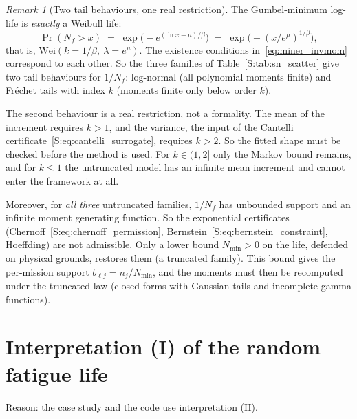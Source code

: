 \documentclass[11pt,a4paper]{article}
\theoremstyle{plain}
\theoremstyle{definition}
\theoremstyle{remark}
\newtheorem{remark}[theorem]{Remark}
\begin{document}
\begin{remark}[Two tail behaviours, one real restriction]\label{rem:miner_tails}
The Gumbel-minimum log-life is \emph{exactly} a Weibull life:
\begin{equation}
  \Pr(N_f > x) \;=\; \exp\big(-e^{(\ln x - \mu)/\beta}\big) \;=\; \exp\big(-(x/e^{\mu})^{1/\beta}\big),
\end{equation}
that is, $\mathrm{Wei}(k = 1/\beta,\ \lambda = e^{\mu})$.
The existence conditions in~\eqref{eq:miner_invmom} correspond to each other.
So the three families of Table~\ref{S:tab:sn_scatter} give two tail behaviours for $1/N_f$: log-normal (all polynomial moments finite) and Fr\'echet tails with index $k$ (moments finite only below order $k$).

The second behaviour is a real restriction, not a formality.
The mean of the increment requires $k > 1$, and the variance, the input of the Cantelli certificate~\eqref{S:eq:cantelli_surrogate}, requires $k > 2$.
So the fitted shape must be checked before the method is used.
For $k \in (1,2]$ only the Markov bound remains, and for $k \le 1$ the untruncated model has an infinite mean increment and cannot enter the framework at all.

Moreover, for \emph{all three} untruncated families, $1/N_f$ has unbounded support and an infinite moment generating function.
So the exponential certificates (Chernoff~\eqref{S:eq:chernoff_permission}, Bernstein~\eqref{S:eq:bernstein_constraint}, Hoeffding) are not admissible.
Only a lower bound $N_{\min} > 0$ on the life, defended on physical grounds, restores them (a truncated family).
This bound gives the per-mission support $b_{\ell j} = n_j / N_{\min}$, and the moments must then be recomputed under the truncated law (closed forms with Gaussian tails and incomplete gamma functions).
\end{remark}

\section{Interpretation (I) of the random fatigue life}

Reason: the case study and the code use interpretation (II).
\end{document}
